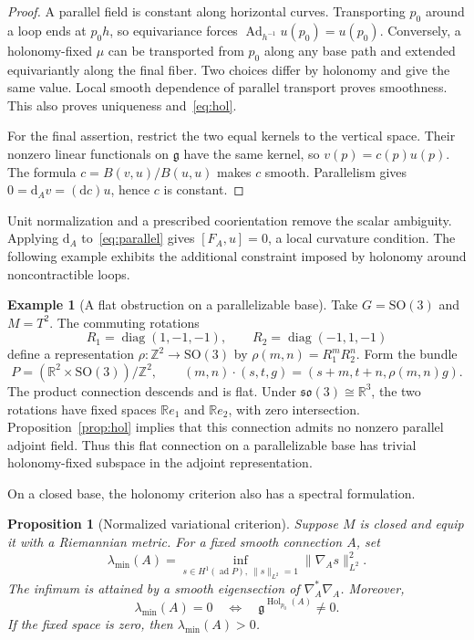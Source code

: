 \documentclass[11pt,a4paper]{article}
\numberwithin{equation}{section}
\newtheorem{proposition}[theorem]{Proposition}
\theoremstyle{definition}
\newtheorem{example}[theorem]{Example}
\theoremstyle{remark}
\newcommand{\g}{\mathfrak g}
\newcommand{\Ad}{\operatorname{Ad}}
\newcommand{\Hol}{\operatorname{Hol}}
\newcommand{\R}{\mathbb R}
\newcommand{\Z}{\mathbb Z}
\newcommand{\SO}{\mathrm{SO}}
\newcommand{\dd}{\mathrm d}
\begin{document}
\begin{proof}
A parallel field is constant along horizontal curves. Transporting $p_0$
around a loop ends at $p_0h$, so equivariance forces
$\Ad_{h^{-1}}u(p_0)=u(p_0)$. Conversely, a holonomy-fixed $\mu$ can be
transported from $p_0$ along any base path and extended equivariantly along
the final fiber. Two choices differ by holonomy and give the same value.
Local smooth dependence of parallel transport proves smoothness. This also
proves uniqueness and~\eqref{eq:hol}.

For the final assertion, restrict the two equal kernels to the vertical
space. Their nonzero linear functionals on $\g$ have the same kernel,
so $v(p)=c(p)u(p)$. The formula
$c=B(v,u)/B(u,u)$ makes $c$ smooth. Parallelism gives
$0=\dd_Av=(\dd c)u$, hence $c$ is constant.
\end{proof}

Unit normalization and a prescribed coorientation remove the scalar
ambiguity. Applying $\dd_A$ to~\eqref{eq:parallel} gives $[F_A,u]=0$,
a local curvature condition. The following example exhibits the additional
constraint imposed by holonomy around noncontractible loops.

\begin{example}[A flat obstruction on a parallelizable base]\label{ex:flat}
Take $G=\SO(3)$ and $M=T^2$. The commuting rotations
\[
 R_1=\operatorname{diag}(1,-1,-1),\qquad
 R_2=\operatorname{diag}(-1,1,-1)
\]
define a representation $\rho:\Z^2\to\SO(3)$ by
$\rho(m,n)=R_1^mR_2^n$. Form the bundle
\[
 P=(\R^2\times\SO(3))/\Z^2,\qquad
 (m,n)\cdot(s,t,g)=(s+m,t+n,\rho(m,n)g).
\]
The product connection descends and is flat. Under
$\mathfrak{so}(3)\cong\R^3$, the two rotations have fixed spaces
$\R e_1$ and $\R e_2$, with zero intersection. Proposition~\ref{prop:hol}
implies that this connection admits no nonzero parallel adjoint field.
Thus this flat connection on a parallelizable base has trivial holonomy-fixed
subspace in the adjoint representation.
\end{example}

On a closed base, the holonomy criterion also has a spectral formulation.

\begin{proposition}[Normalized variational criterion]\label{prop:variation}
Suppose $M$ is closed and equip it with a Riemannian metric. For a fixed smooth
connection $A$, set
\begin{equation}\label{eq:rayleigh}
 \lambda_{\min}(A)=\inf_{s\in H^1(\operatorname{ad}P),\ \|s\|_{L^2}=1}
                    \|\nabla_A s\|_{L^2}^2.
\end{equation}
The infimum is attained by a smooth eigensection of
$\nabla_A^*\nabla_A$. Moreover,
\[
 \lambda_{\min}(A)=0
 \quad\Longleftrightarrow\quad
 \g^{\Hol_{p_0}(A)}\ne0.
\]
If the fixed space is zero, then $\lambda_{\min}(A)>0$.
\end{proposition}
\end{document}

